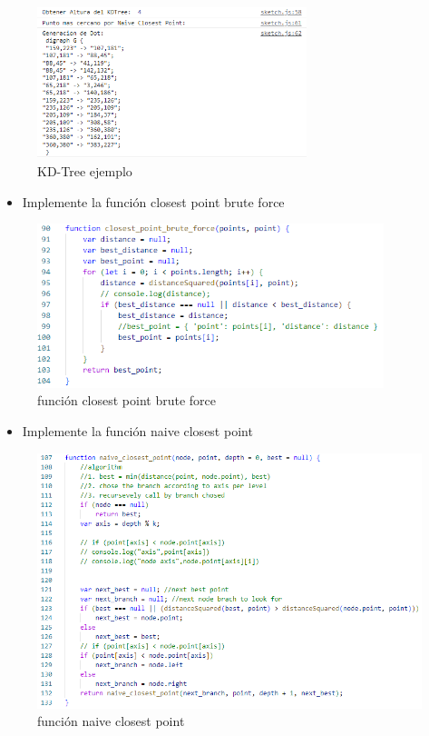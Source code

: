 \documentclass{article}
\begin{document}
\begin{enumerate}
\begin{figure}[H]
\centering
\includegraphics[width=0.7\textwidth]{Img/Digraph G.png}
\caption{KD-Tree ejemplo}
\end{figure}

\begin{itemize}
   \item Implemente la función closest point brute force 
\end{itemize}

\begin{figure}[H]
\centering
\includegraphics[width=0.9\textwidth]{Img/closest_point_brute_force.png}
\caption{función closest point brute force}
\end{figure}

\begin{itemize}
   \item Implemente la función naive closest point  
\end{itemize}

\begin{figure}[H]
\centering
\includegraphics[width=1\textwidth]{Img/naive_closest_point.png}
\caption{función naive closest point}
\end{figure}


\end{enumerate}
\end{document}
